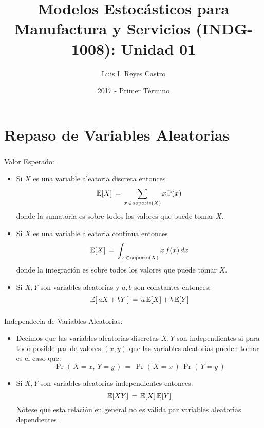 \documentclass[ 10pt, xcolor = dvipsnames]{beamer}
\title[Modelos Estoc\'asticos: Unidad 01]{Modelos Estoc\'asticos para Manufactura y Servicios (INDG-1008): \textbf{Unidad 01} }
\author[L. I. Reyes Castro]{Luis I. Reyes Castro}
\institute[ESPOL]{\normalsize Escuela Superior Polit\'ecnica del Litoral (ESPOL) \\ Guayaquil - Ecuador}
\date[2017-T1]{2017 - Primer T\'ermino}
\begin{document}



\section{Repaso de Variables Aleatorias}

\begin{frame}[allowframebreaks]
\frametitle{\insertsection}

Valor Esperado: 
\begin{itemize}
\item Si $X$ es una variable aleatoria discreta entonces 
\[
\mathbb{E}[X] \, = \, \sum_{ x \, \in \, \text{soporte}(X) } x \, \mathbb{P}(x)
\]
donde la sumatoria es sobre todos los valores que puede tomar $X$. 
\item Si $X$ es una variable aleatoria continua entonces 
\[
\mathbb{E}[X] \, = \, \int_{ x \, \in \, \text{soporte}(X) } x \, f(x) \, dx
\]
donde la integraci\'on es sobre todos los valores que puede tomar $X$. 
\item Si $X,Y$ son variables aleatorias y $a,b$ son constantes entonces: 
\[
\mathbb{E}[ \, a X + b Y \, ] \, = \, a \, \mathbb{E}[X] + b \, \mathbb{E}[Y]
\]
\end{itemize}

\end{frame}

\begin{frame}[allowframebreaks]
\frametitle{\insertsection}

Independecia de Variables Aleatorias: 
\begin{itemize}
\item Decimos que las variables aleatorias discretas $X,Y$ son independientes si \linebreak para todo posible par de valores $(x,y)$ que las variables aleatorias \linebreak pueden tomar es el caso que: 
\[
\Pr( \, X = x, \, Y = y \, ) \, = \,
\Pr( \, X = x \, ) \, \Pr( \, Y = y \, )
\]
\item Si $X,Y$ son variables aleatorias independientes entonces: 
\[
\mathbb{E}[XY] \, = \, \mathbb{E}[X] \, \mathbb{E}[Y]
\]
N\'otese que esta relaci\'on en general no es v\'alida par variables aleatorias dependientes. 
\end{itemize}

\end{frame}
\end{document}
